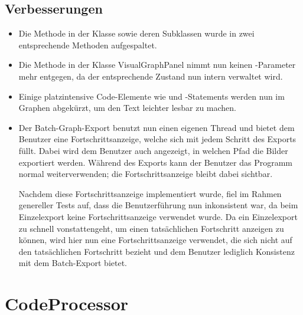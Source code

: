 \subsection{Verbesserungen}
\begin{itemize}
  \item Die Methode  in der Klasse  sowie deren Subklassen wurde in zwei entsprechende Methoden aufgespaltet.
  \item Die Methode  in der Klasse VisualGraphPanel nimmt nun keinen -Parameter mehr entgegen, da der entsprechende Zustand nun intern verwaltet wird.
  \item Einige platzintensive Code-Elemente wie  und -Statements werden nun im Graphen abgekürzt, um den Text leichter lesbar zu machen.
  \item Der Batch-Graph-Export benutzt nun einen eigenen Thread und bietet dem Benutzer eine Fortschrittsanzeige, welche sich mit jedem Schritt des Exports füllt.
        Dabei wird dem Benutzer auch angezeigt, in welchen Pfad die Bilder exportiert werden.
        Während des Exports kann der Benutzer das Programm normal weiterverwenden; die Fortschrittsanzeige bleibt dabei sichtbar.
        
        Nachdem diese Fortschrittsanzeige implementiert wurde, fiel im Rahmen genereller Tests auf, dass die Benutzerführung nun inkonsistent war, da beim Einzelexport keine Fortschrittsanzeige verwendet wurde.
        Da ein Einzelexport zu schnell vonstattengeht, um einen tatsächlichen Fortschritt anzeigen zu können, wird hier nun eine Fortschrittsanzeige verwendet, die sich nicht auf den tatsächlichen Fortschritt bezieht und dem Benutzer lediglich Konsistenz mit dem Batch-Export bietet.
\end{itemize}

\section{CodeProcessor}

